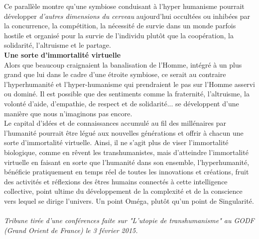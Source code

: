 \documentclass[11pt,twoside,a4paper]{article}
\begin{document}
Ce parall{\`e}le montre qu'une symbiose conduisant {\`a} l'hyper humanisme pourrait d{\'e}velopper \emph{d'autres dimensions du cerveau} aujourd'hui occult{\'e}es ou inhib{\'e}es par la concurrence, la comp{\'e}tition, la n{\'e}cessit{\'e} de survie dans un monde parfois hostile et organis{\'e} pour la survie de l'individu plut{\^o}t que la coop{\'e}ration, la solidarit{\'e}, l'altruisme et le partage. ~\\

\textbf{Une sorte d'immortalit{\'e} virtuelle}~\\

Alors que beaucoup craignaient la banalisation de l'Homme, int{\'e}gr{\'e} {\`a} un plus grand que lui dans le cadre d'une {\'e}troite symbiose, ce serait au contraire l'hyperhumanit{\'e} et l'hyper-humanisme qui prendraient le pas sur l'Homme asservi ou domin{\'e}. Il est possible que des sentiments comme la fraternit{\'e}, l'altruisme, la volont{\'e} d'aide, d'empathie, de respect et de solidarit{\'e}... se d{\'e}veloppent d'une mani{\`e}re que nous n'imaginons pas encore. ~\\

Le capital d'id{\'e}es et de connaissances accumul{\'e} au fil des mill{\'e}naires par l'humanit{\'e} pourrait {\^e}tre l{\'e}gu{\'e} aux nouvelles g{\'e}n{\'e}rations et offrir {\`a} chacun une sorte d'immortalit{\'e} virtuelle. Ainsi, il ne s'agit plus de viser l'immortalit{\'e} biologique, comme en r{\^e}vent les transhumanistes, mais d'atteindre l'immortalit{\'e} virtuelle en faisant en sorte que l'humanit{\'e} dans son ensemble, l'hyperhumanit{\'e}, b{\'e}n{\'e}ficie pratiquement en temps r{\'e}el de toutes les innovations et cr{\'e}ations, fruit des activit{\'e}s et r{\'e}flexions des {\^e}tres humains connect{\'e}s {\`a} cette intelligence collective, point ultime du d{\'e}veloppement de la complexit{\'e} et de la conscience vers lequel se dirige l'univers. Un point Om{\'e}ga, plut{\^o}t qu'un point de Singularit{\'e}. ~\\

\emph{Tribune tir{\'e}e d'une conf{\'e}rences faite sur "L'utopie de transhumanisme" au GODF (Grand Orient de France) le 3 f{\'e}vrier 2015. }
\end{document}
